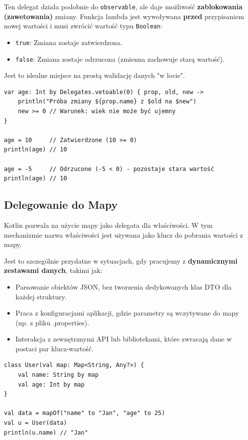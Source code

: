 Ten delegat działa podobnie do \texttt{observable}, ale daje możliwość \textbf{zablokowania (zawetowania)} zmiany. Funkcja lambda jest wywoływana \textbf{przed} przypisaniem nowej wartości i musi zwrócić wartość typu \texttt{Boolean}:
\begin{itemize}
    \item \texttt{true}: Zmiana zostaje zatwierdzona.
    \item \texttt{false}: Zmiana zostaje odrzucona (zmienna zachowuje starą wartość).
\end{itemize}

Jest to idealne miejsce na prostą walidację danych "w locie".

\begin{verbatim}
var age: Int by Delegates.vetoable(0) { prop, old, new ->
    println("Próba zmiany ${prop.name} z $old na $new")
    new >= 0 // Warunek: wiek nie może być ujemny
}

age = 10     // Zatwierdzone (10 >= 0)
println(age) // 10

age = -5     // Odrzucone (-5 < 0) - pozostaje stara wartość
println(age) // 10
\end{verbatim}

\subsection{Delegowanie do Mapy}

Kotlin pozwala na użycie mapy jako delegata dla właściwości. W tym mechanizmie nazwa właściwości jest używana jako klucz do pobrania wartości z mapy.

Jest to szczególnie przydatne w sytuacjach, gdy pracujemy z \textbf{dynamicznymi zestawami danych}, takimi jak:
\begin{itemize}
    \item Parsowanie obiektów JSON, bez tworzenia dedykowanych klas DTO dla każdej struktury.
    \item Praca z konfiguracjami aplikacji, gdzie parametry są wczytywane do mapy (np. z pliku .properties).
    \item Interakcja z zewnętrznymi API lub bibliotekami, które zwracają dane w postaci par klucz-wartość.
\end{itemize}

\begin{verbatim}
class User(val map: Map<String, Any?>) {
    val name: String by map
    val age: Int by map
}

val data = mapOf("name" to "Jan", "age" to 25)
val u = User(data)
println(u.name) // "Jan"
\end{verbatim}

